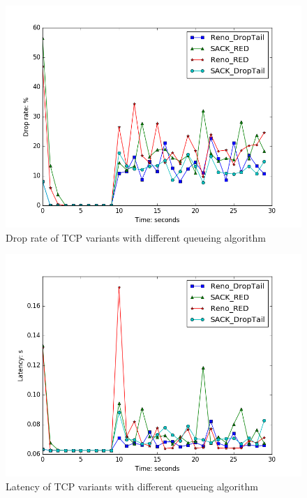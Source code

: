 \documentclass[10pt, conference]{IEEEtran/IEEEtran}
\begin{document}
\begin{figure}[htbp]
\begin{center}
\includegraphics[width=\linewidth]{../exp3/exp3_drop.png}
\caption{Drop rate of TCP variants with different queueing algorithm}
\label{exp1_drop}
\end{center}
\end{figure}

\begin{figure}[htbp]
\begin{center}
\includegraphics[width=\linewidth]{../exp3/exp3_lat.png}
\caption{Latency of TCP variants with different queueing algorithm}
\label{exp1_lat}
\end{center}
\end{figure}
\end{document}
